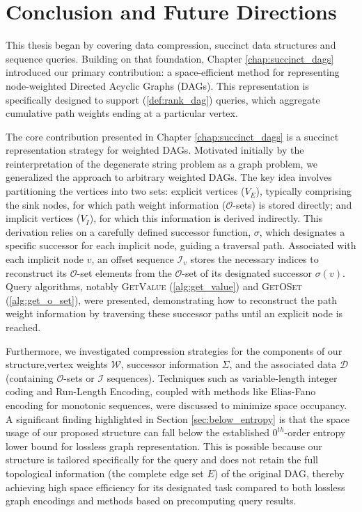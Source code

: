 \chapter{Conclusion and Future Directions}
\label{chap:conclusion}

This thesis began by covering data compression, succinct data structures and sequence queries. Building on that foundation, Chapter \ref{chap:succinct_dags} introduced our primary contribution: a space-efficient method for representing node-weighted Directed Acyclic Graphs (DAGs). This representation is specifically designed to support \Rank{} (\ref{def:rank_dag}) queries, which aggregate cumulative path weights ending at a particular vertex.

The core contribution presented in Chapter \ref{chap:succinct_dags} is a succinct representation strategy for weighted DAGs. Motivated initially by the reinterpretation of the degenerate string problem as a graph problem, we generalized the approach to arbitrary weighted DAGs. The key idea involves partitioning the vertices into two sets: explicit vertices ($V_E$), typically comprising the sink nodes, for which path weight information ($\mathcal{O}$-sets) is stored directly; and implicit vertices ($V_I$), for which this information is derived indirectly. This derivation relies on a carefully defined successor function, $\sigma$, which designates a specific successor for each implicit node, guiding a traversal path. Associated with each implicit node $v$, an offset sequence $\mathcal{I}_v$ stores the necessary indices to reconstruct its $\mathcal{O}$-set elements from the $\mathcal{O}$-set of its designated successor $\sigma(v)$. Query algorithms, notably \textsc{GetValue} (\ref{alg:get_value}) and \textsc{GetOSet} (\ref{alg:get_o_set}), were presented, demonstrating how to reconstruct the path weight information by traversing these successor paths until an explicit node is reached.

Furthermore, we investigated compression strategies for the components of our structure,vertex weights $\mathcal{W}$, successor information $\Sigma$, and the associated data $\mathcal{D}$ (containing $\mathcal{O}$-sets or $\mathcal{I}$ sequences). Techniques such as variable-length integer coding and Run-Length Encoding, coupled with methods like Elias-Fano encoding for monotonic sequences, were discussed to minimize space occupancy. A significant finding highlighted in Section \ref{sec:below_entropy} is that the space usage of our proposed structure can fall below the established $0^{th}$-order entropy lower bound for lossless graph representation. This is possible because our structure is tailored specifically for the \Rank{} query and does not retain the full topological information (the complete edge set $E$) of the original DAG, thereby achieving high space efficiency for its designated task compared to both lossless graph encodings and methods based on precomputing query results.

